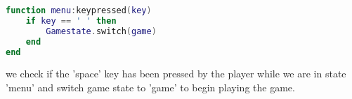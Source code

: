 \begin{minipage}[t]{1\linewidth}
\begin{lstlisting}[language=Lua, %
  title={Keypressed Event}, label=keypressed]
	function menu:keypressed(key)
    if key == ' ' then
        Gamestate.switch(game)
    end
end

\end{lstlisting}
\end{minipage}
we check if the 'space' key has been pressed by the player while we are in state 'menu' and switch game state to 'game' to begin playing the game.